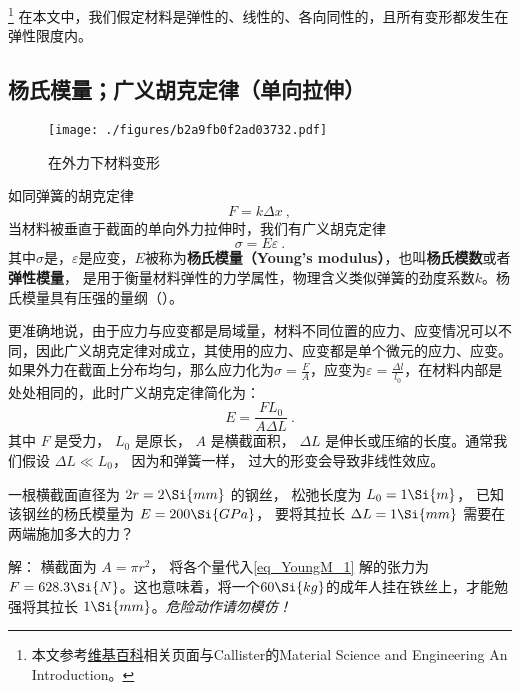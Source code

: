 
\begin{issues}
\issueDraft
\end{issues}

\footnote{本文参考\href{https://en.wikipedia.org/wiki/Young's_modulus}{维基百科}相关页面与Callister的Material Science and Engineering An Introduction。}
在本文中，我们假定材料是弹性的、线性的、各向同性的，且所有变形都发生在弹性限度内。

\subsection{杨氏模量；广义胡克定律（单向拉伸）}
\begin{figure}[ht]
\centering
\texttt{[image: ./figures/b2a9fb0f2ad03732.pdf]}
\caption{在外力下材料变形} \label{fig_YoungM_1}
\end{figure}

如同弹簧的胡克定律
$$F=k \Delta x~,$$
当材料被垂直于截面的单向外力拉伸时，我们有广义胡克定律
\begin{equation}
\sigma = E \varepsilon~.
\end{equation}
其中$\sigma$是，$\varepsilon$是应变，$E$被称为\textbf{杨氏模量（Young's modulus）}，也叫\textbf{杨氏模数}或者\textbf{弹性模量}， 是用于衡量材料弹性的力学属性，物理含义类似弹簧的劲度系数$k$。杨氏模量具有压强的量纲（）。

更准确地说，由于应力与应变都是局域量，材料不同位置的应力、应变情况可以不同，因此广义胡克定律对成立，其使用的应力、应变都是单个微元的应力、应变。%
如果外力在截面上分布均匀，那么应力化为$\sigma=\frac{F}{A}$，应变为$\varepsilon=\frac{\Delta l}{l_0}$，在材料内部是处处相同的，此时广义胡克定律简化为：%
\begin{equation}\label{eq_YoungM_1}
E = \frac{FL_0}{A\Delta L}~.
\end{equation}
其中 $F$ 是受力， $L_0$ 是原长， $A$ 是横截面积， $\Delta L$ 是伸长或压缩的长度。通常我们假设 $\Delta L \ll L_0$， 因为和弹簧一样， 过大的形变会导致非线性效应。

\begin{example}{}
一根横截面直径为 $2r = 2\Si{mm}$ 的钢丝， 松弛长度为 $L_0 = 1\Si{m}$， 已知该钢丝的杨氏模量为 $E = 200\Si{GPa}$， 要将其拉长 $\Delta L = 1\Si{mm}$ 需要在两端施加多大的力？

解： 横截面为 $A = \pi r^2$， 将各个量代入\autoref{eq_YoungM_1} 解的张力为 $F = 628.3\Si{N}$。这也意味着，将一个$60 \Si{kg}$的成年人挂在铁丝上，才能勉强将其拉长 $1\Si{mm}$。\textsl{危险动作请勿模仿！}
\end{example}

